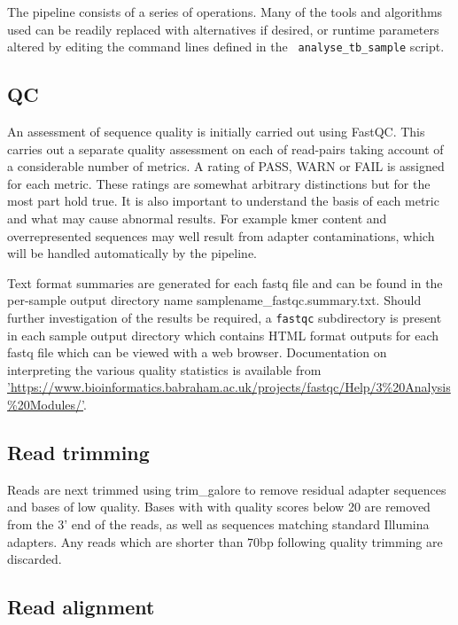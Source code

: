 \documentclass[a4paper,10pt,twoside]{article}
\begin{document}
The pipeline consists of a series of operations. Many of the tools and
algorithms used can be readily replaced with alternatives if desired, or
runtime parameters altered by editing the command lines defined in the {\tt
analyse\_tb\_sample} script. 

\subsection{QC}

An assessment of sequence quality is initially carried out using FastQC. This
carries out a separate quality assessment on each of read-pairs taking account
of a considerable number of metrics. A rating of PASS, WARN or FAIL is assigned
for each metric. These ratings are somewhat arbitrary distinctions but for the
most part hold true. It is also important to understand the basis of each
metric and what may cause abnormal results. For example kmer content and
overrepresented sequences may well result from adapter contaminations, which
will be handled automatically by the pipeline. 

Text format summaries are generated for each fastq file and can be found in the
per-sample output directory name samplename\_fastqc.summary.txt. Should further
investigation of the results be required, a {\tt fastqc} subdirectory is
present in each sample output directory which contains HTML format outputs for
each fastq file which can be viewed with a web browser. Documentation on
interpreting the various quality statistics is available from
\href{https://www.bioinformatics.babraham.ac.uk/projects/fastqc/Help/3\%20Analysis\%20Modules}{'https://www.bioinformatics.babraham.ac.uk/projects/fastqc/Help/3\%20Analysis\%20Modules/'}.

\subsection{Read trimming}

Reads are next trimmed using trim\_galore to remove residual adapter sequences
and bases of low quality. Bases with with quality scores below 20 are removed
from the 3' end of the reads, as well as sequences matching standard Illumina
adapters. Any reads which are shorter than 70bp following quality trimming are
discarded.

\subsection{Read alignment}
\end{document}
